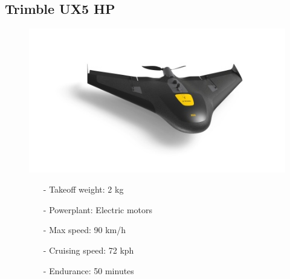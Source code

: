 \documentclass{article}
\begin{document}
\subsection{Trimble UX5 HP}
\begin{figure}[h]
    \begin{minipage}[b]{.45\linewidth}
        \centering
        \includegraphics[width=0.7\linewidth]{Aircraft pics/Trimble Ux5 hp.png}
        
    \end{minipage}\hfill
    \begin{minipage}[b]{0.45\linewidth}
        \begin{itemize}
            \item [-] Takeoff weight: 2 kg
            \item [-] Powerplant: Electric motors
            \item [-] Max speed: 90 km/h 
            \item [-] Cruising speed: 72 kph 
            \item [-] Endurance: 50 minutes
        \end{itemize}
    \end{minipage}
\end{figure}

\vspace{\fill}
\end{document}
